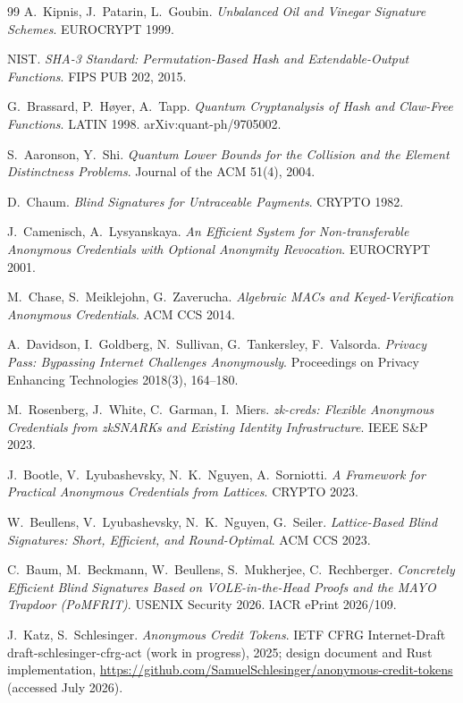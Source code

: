 \documentclass[11pt]{article}
\begin{document}
\begin{thebibliography}{99}
A.~Kipnis, J.~Patarin, L.~Goubin.
\emph{Unbalanced Oil and Vinegar Signature Schemes}.
EUROCRYPT 1999.

NIST.
\emph{SHA-3 Standard: Permutation-Based Hash and Extendable-Output
Functions}.
FIPS PUB 202, 2015.

G.~Brassard, P.~H{\o}yer, A.~Tapp.
\emph{Quantum Cryptanalysis of Hash and Claw-Free Functions}.
LATIN 1998. arXiv:quant-ph/9705002.

S.~Aaronson, Y.~Shi.
\emph{Quantum Lower Bounds for the Collision and the Element Distinctness
Problems}.
Journal of the ACM 51(4), 2004.

D.~Chaum.
\emph{Blind Signatures for Untraceable Payments}.
CRYPTO 1982.

J.~Camenisch, A.~Lysyanskaya.
\emph{An Efficient System for Non-transferable Anonymous Credentials with
Optional Anonymity Revocation}.
EUROCRYPT 2001.

M.~Chase, S.~Meiklejohn, G.~Zaverucha.
\emph{Algebraic MACs and Keyed-Verification Anonymous Credentials}.
ACM CCS 2014.

A.~Davidson, I.~Goldberg, N.~Sullivan, G.~Tankersley, F.~Valsorda.
\emph{Privacy Pass: Bypassing Internet Challenges Anonymously}.
Proceedings on Privacy Enhancing Technologies 2018(3), 164--180.

M.~Rosenberg, J.~White, C.~Garman, I.~Miers.
\emph{zk-creds: Flexible Anonymous Credentials from zkSNARKs and Existing
Identity Infrastructure}.
IEEE S\&P 2023.

J.~Bootle, V.~Lyubashevsky, N.~K.~Nguyen, A.~Sorniotti.
\emph{A Framework for Practical Anonymous Credentials from Lattices}.
CRYPTO 2023.

W.~Beullens, V.~Lyubashevsky, N.~K.~Nguyen, G.~Seiler.
\emph{Lattice-Based Blind Signatures: Short, Efficient, and Round-Optimal}.
ACM CCS 2023.

C.~Baum, M.~Beckmann, W.~Beullens, S.~Mukherjee, C.~Rechberger.
\emph{Concretely Efficient Blind Signatures Based on VOLE-in-the-Head
Proofs and the MAYO Trapdoor (PoMFRIT)}.
USENIX Security 2026. IACR ePrint 2026/109.

J.~Katz, S.~Schlesinger.
\emph{Anonymous Credit Tokens}.
IETF CFRG Internet-Draft draft-schlesinger-cfrg-act (work in progress),
2025; design document and Rust implementation,
\url{https://github.com/SamuelSchlesinger/anonymous-credit-tokens}
(accessed July 2026).

\end{thebibliography}
\end{document}
